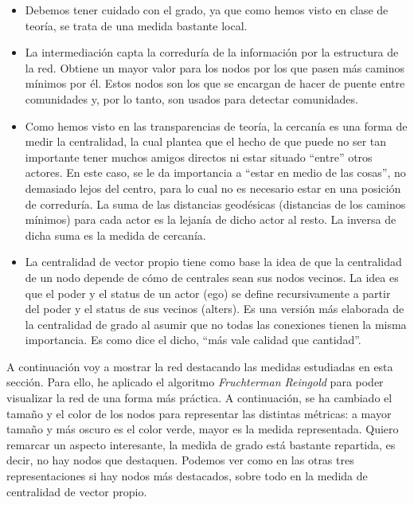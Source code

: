 \documentclass[11pt]{article}
\begin{document}
\begin{itemize}
	\item Debemos tener cuidado con el grado, ya que como hemos visto en clase de teoría, se trata de una medida bastante local.
	\item La intermediación capta la correduría de la información por la estructura de la red. Obtiene un mayor valor para los nodos por los que pasen más caminos mínimos por él. Estos nodos son los que se encargan de hacer de puente entre comunidades y, por lo tanto, son usados para detectar comunidades.
	\item Como hemos visto en las transparencias de teoría, la cercanía es una forma de medir la centralidad, la cual plantea que el hecho de que puede no ser tan importante tener muchos amigos directos ni estar situado ``entre'' otros actores. En este caso, se le da importancia a ``estar en medio de las cosas'', no demasiado lejos del centro, para lo cual no es necesario estar en una posición de correduría. La suma de las distancias geodésicas (distancias de los caminos mínimos) para cada actor es la lejanía de dicho actor al resto. La inversa de dicha suma es la medida de cercanía.
	\item La centralidad de vector propio tiene como base la idea de que la centralidad de un nodo depende de cómo de centrales sean sus nodos vecinos. La idea es que el poder y el status de un actor (ego) se define recursivamente a partir del poder y el status de sus vecinos (alters). Es una versión más elaborada de la centralidad de grado al asumir que no todas las conexiones tienen la misma importancia. Es como dice el dicho, ``más vale calidad que cantidad''.
\end{itemize}

A continuación voy a mostrar la red destacando las medidas estudiadas en esta sección. Para ello, he aplicado el algoritmo \textit{Fruchterman Reingold} para poder visualizar la red de una forma más práctica. A continuación, se ha cambiado el tamaño y el color de los nodos para representar las distintas métricas: a mayor tamaño y más oscuro es el color verde, mayor es la medida representada. Quiero remarcar un aspecto interesante, la medida de grado está bastante repartida, es decir, no hay nodos que destaquen. Podemos ver como en las otras tres representaciones si hay nodos más destacados, sobre todo en la medida de centralidad de vector propio.
\end{document}
